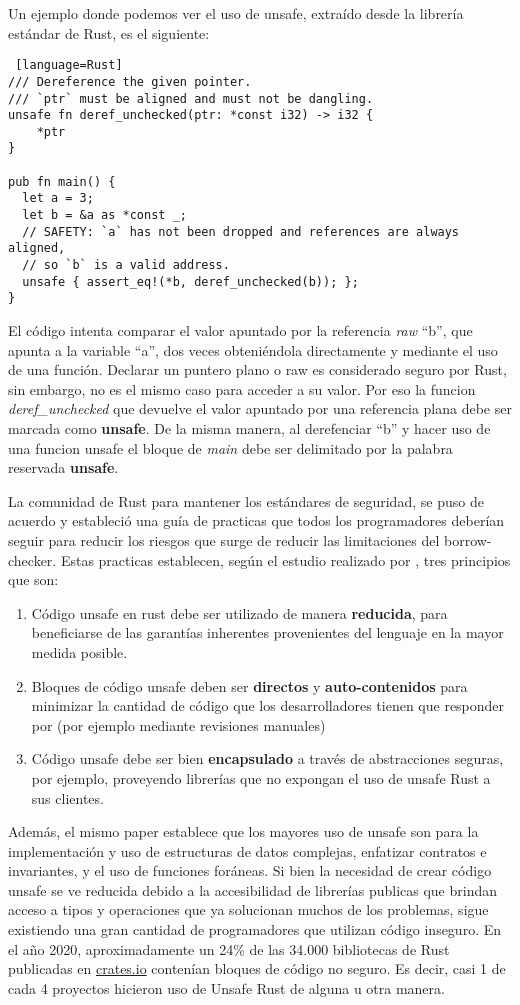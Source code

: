 Un ejemplo donde podemos ver el uso de unsafe, extraído desde la librería estándar de Rust, es el siguiente:
\begin{lstlisting} [language=Rust]
/// Dereference the given pointer.
/// `ptr` must be aligned and must not be dangling.
unsafe fn deref_unchecked(ptr: *const i32) -> i32 {
    *ptr
}

pub fn main() {
  let a = 3;
  let b = &a as *const _;
  // SAFETY: `a` has not been dropped and references are always aligned,
  // so `b` is a valid address.
  unsafe { assert_eq!(*b, deref_unchecked(b)); };
}
\end{lstlisting}

El código intenta comparar el valor apuntado por la referencia \textit{raw} ``b'', que apunta a la variable ``a'', dos veces obteniéndola directamente y mediante el uso de una función. Declarar un puntero plano o raw es considerado seguro por Rust, sin embargo, no es el mismo caso para acceder a su valor. Por eso la funcion \textit{deref\_unchecked} que devuelve el valor apuntado por una referencia plana debe ser marcada como \textbf{unsafe}. De la misma manera, al derefenciar ``b'' y hacer uso de una funcion unsafe el bloque de \textit{main} debe ser delimitado por la palabra reservada \textbf{unsafe}.

La comunidad de Rust para mantener los estándares de seguridad, se puso de acuerdo y estableció una guía de practicas que todos los programadores deberían seguir para reducir los riesgos que surge de reducir las limitaciones del borrow-checker. Estas practicas establecen, según el estudio realizado por \cite{astrauskas2020programmers}, tres principios que son:
\begin{enumerate}
  \item Código unsafe en rust debe ser utilizado de manera \textbf{reducida}, para beneficiarse de las garantías inherentes provenientes del lenguaje en la mayor medida posible.
  \item Bloques de código unsafe deben ser \textbf{directos} y \textbf{auto-contenidos} para minimizar la cantidad de código que los desarrolladores tienen que responder por (por ejemplo mediante revisiones manuales)
  \item Código unsafe debe ser bien \textbf{encapsulado} a través de abstracciones seguras, por ejemplo, proveyendo librerías que no expongan el uso de unsafe Rust a sus clientes.
\end{enumerate}

Además, el mismo paper establece que los mayores uso de unsafe son para la implementación y uso de estructuras de datos complejas, enfatizar contratos e invariantes, y el uso de funciones foráneas. Si bien la necesidad de crear código unsafe se ve reducida debido a la accesibilidad de librerías publicas que brindan acceso a tipos y operaciones que ya solucionan muchos de los problemas, sigue existiendo una gran cantidad de programadores que utilizan código inseguro. En el año 2020, aproximadamente un 24\% de las 34.000 bibliotecas de Rust publicadas en \url{crates.io} contenían bloques de código no seguro. Es decir, casi 1 de cada 4 proyectos hicieron uso de Unsafe Rust de alguna u otra manera.

